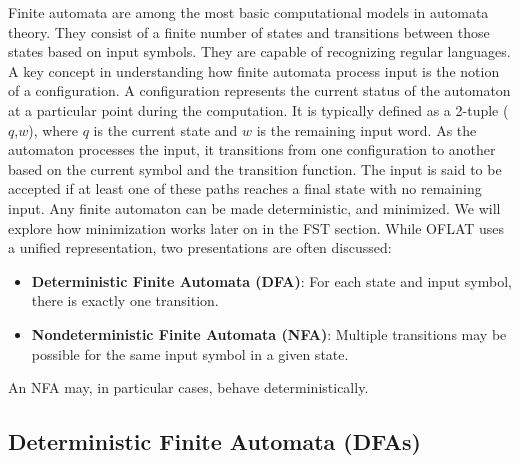 Finite automata are among the most basic computational models in automata theory. 
They consist of a finite number of states and transitions between those states based on input symbols. They are capable of recognizing regular languages.
A key concept in understanding how finite automata process input is the notion of a configuration. 
A configuration represents the current status of the automaton at a particular point during the computation. 
It is typically defined as a 2-tuple (\(q\),\(w\)), where \(q\) is the current state and \(w\) is the remaining input word. 
As the automaton processes the input, it transitions from one configuration to another based on the current symbol and the transition function.
The input is said to be accepted if at least one of these paths reaches a final state with no remaining input.
Any finite automaton can be made deterministic, and minimized. We will explore how minimization works later on in the FST section.
While OFLAT uses a unified representation, two presentations are often discussed:
\begin{itemize}
    \item \textbf{Deterministic Finite Automata (DFA)}: For each state and input symbol, there is exactly one transition.
    \item \textbf{Nondeterministic Finite Automata (NFA)}: Multiple transitions may be possible for the same input symbol in a given state.
\end{itemize}
An NFA may, in particular cases, behave deterministically.

\subsection{Deterministic Finite Automata (DFAs)}

